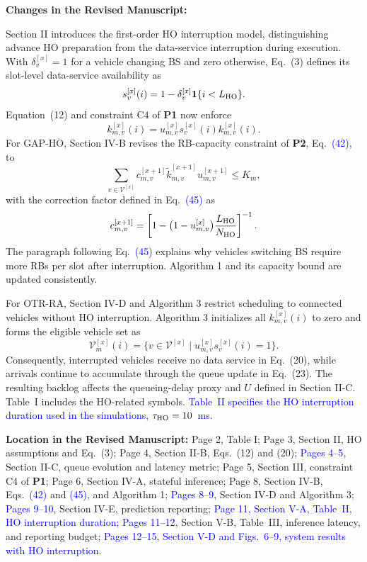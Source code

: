 \documentclass[11pt]{article}
\newenvironment{reviewedit}[1]
{\colorlet{responseblue}{#1}\colorlet{changeblue}{#1}\color{#1}}
{}
\newenvironment{manuscriptchanges}
{\par\noindent\textcolor{changeblue}{\textbf{Changes in the Revised Manuscript:}}\par\color{changeblue}}
{\par}
\newcommand{\revisionlocation}[1]{%
  \par\noindent\textbf{Location in the Revised Manuscript:} #1\par
}
\begin{document}
\begin{reviewedit}{blue}
\begin{manuscriptchanges}
Section II introduces the first-order HO interruption model, distinguishing
advance HO preparation from the data-service interruption during execution.
With $\delta_v^{[x]}=1$ for a vehicle changing BS and zero otherwise,
Eq.~(3) defines its slot-level data-service availability as
\[
s_v^{[x]}(i)=1-\delta_v^{[x]}\mathbf{1}\{i<L_{\rm HO}\}.
\]
Equation~(12) and constraint C4 of \textbf{P1} now enforce
\[
k_{m,v}^{[x]}(i)=u_{m,v}^{[x]}s_v^{[x]}(i)k_{m,v}^{[x]}(i).
\]
For GAP-HO, Section IV-B revises the RB-capacity constraint of \textbf{P2},
Eq.~\textcolor{blue}{(42)}, to
\[
\sum_{v\in\mathcal{V}^{[x]}}
c_{m,v}^{[x+1]}\tilde{k}_{m,v}^{[x+1]}u_{m,v}^{[x+1]}\leq K_m,
\]
with the correction factor defined in Eq.~\textcolor{blue}{(45)} as
\[
c_{m,v}^{[x+1]}=
\left[1-\bigl(1-u_{m,v}^{[x]}\bigr)
\frac{L_{\rm HO}}{N_{\rm HO}}\right]^{-1}.
\]
The paragraph following Eq.~\textcolor{blue}{(45)} explains why vehicles switching BS require
more RBs per slot after interruption. Algorithm 1 and its capacity bound
are updated consistently.

For OTR-RA, Section IV-D and Algorithm 3 restrict scheduling to connected
vehicles without HO interruption. Algorithm 3 initializes all
$k_{m,v}^{[x]}(i)$ to zero and forms the eligible vehicle set as
\[
\mathcal{V}_m^{[x]}(i)=
\{v\in\mathcal{V}^{[x]}\mid u_{m,v}^{[x]}s_v^{[x]}(i)=1\}.
\]
Consequently, interrupted vehicles receive no data service in Eq.~(20),
while arrivals continue to accumulate through the queue update in Eq.~(23).
The resulting backlog affects the queueing-delay proxy and $U$ defined in
Section II-C. Table~I includes the HO-related symbols.
\textcolor{blue}{Table~II specifies the HO interruption duration used in the
simulations, $\tau_{\rm HO}=10$~ms.}
\end{manuscriptchanges}
\revisionlocation{Page 2, Table I;
Page 3, Section II, HO assumptions and Eq.~(3);
Page 4, Section II-B, Eqs.~(12) and (20);
\textcolor{blue}{Pages 4--5}, Section II-C, queue evolution and latency metric;
Page 5, Section III, constraint C4 of \textbf{P1};
Page 6, Section IV-A, stateful inference;
Page 8, Section IV-B, Eqs.~\textcolor{blue}{(42)} and \textcolor{blue}{(45)}, and Algorithm 1;
\textcolor{blue}{Pages 8--9}, Section IV-D and Algorithm 3;
\textcolor{blue}{Pages 9--10}, Section IV-E, prediction reporting;
\textcolor{blue}{Page 11, Section V-A, Table~II, HO interruption duration;}
\textcolor{blue}{Pages 11--12}, Section V-B, Table~III, inference latency, and reporting budget;
\textcolor{blue}{Pages \textcolor{blue}{12--15}, Section V-D and Figs.~\textcolor{blue}{6--9}, system results with HO interruption.}}

\end{reviewedit}
\end{document}
